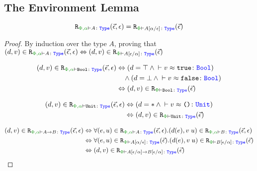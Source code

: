 \documentclass{Report}
\newcommand\erelates[2]{\texttt{R}_{\wellformedt{#1}{#2}}}
\newcommand\inLogRel[5]{(#1, #2)\in\erelates{#3}{#4}(#5)}
\newcommand\inLogRelE[4]{\inLogRel{#1}{#2}{#3}{#4}{\ev}}
\newcommand{\inLogRelPE}[3]{\inLogRelE{#1}{#2}{\P}{#3}}
\begin{document}
\subsection{The Environment Lemma}


\begin{lemma}
    $$\erelates{\P,\a}{A}(\ev, \e) = \erelates{\P}{A\ssub{\e}{\a}}(\ev)$$
\end{lemma}

\begin{proof}
    By induction over the type $A$, proving that $\inLogRel{d}{v}{\P,\a}{A}{\ev, \e} \Leftrightarrow \inLogRelPE{d}{v}{A\ssub{\a}{\e}}$

        \begin{align*}
            \inLogRel{d}{v}{\P,\a}{\B}{\ev, \e} & \Leftrightarrow (d = \top \wedge \zberelation{v}{\t}{\B})
            \\ 
            & \quad\wedge(d = \bot \wedge \zberelation{v}{\f}{\B})
            \\
            & \Leftrightarrow  \inLogRelPE{d}{v}{\B}
        \end{align*}

    \begin{align*}
        \inLogRel{d}{v}{\P,\a}{\U}{\ev, \e} & \Leftrightarrow (d = \singleton \wedge \zberelation{v}{\u}{\U})
        \\
        & \Leftrightarrow  \inLogRelPE{d}{v}{\U}
    \end{align*}

    \case{\tfun}
    \begin{align*}
        \inLogRel{d}{v}{\P,\a}{\ab}{\ev, \e} & \Leftrightarrow \forall\inLogRel{e}{u}{\P,\a}{A}{\ev, \e}. \inLogRel{d(e)}{\apply{v}{u}}{\P,\a}{B}{\ev, \e} 
        \\
        & \Leftrightarrow 
        \forall\inLogRelPE{e}{u}{A\ssub{\e}{\a}}. \inLogRelPE{d(e)}{\apply{v}{u}}{B\ssub{\a}{\e}}
        \\
        & \Leftrightarrow  \inLogRelPE{d}{v}{\fntype{A\ssub{\a}{\e}}{B\ssub{\a}{\e}}}
        \\
    \end{align*}

    \case{\teffect}


\end{proof}
\end{document}
